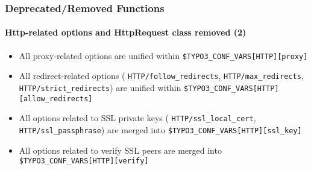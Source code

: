 \begin{frame}[fragile]
	\frametitle{Deprecated/Removed Functions}
	\framesubtitle{Http-related options and HttpRequest class removed (2)}

	\begin{itemize}

		\item All proxy-related options are unified within\newline
			\small\texttt{\$TYPO3\_CONF\_VARS[HTTP][proxy]}\normalsize

		\item All redirect-related options
			(\small
				\texttt{HTTP/follow\_redirects},
				\texttt{HTTP/max\_redirects},
				\texttt{HTTP/strict\_redirects}\normalsize)
			are unified within
			\small
				\texttt{\$TYPO3\_CONF\_VARS[HTTP][allow\_redirects]}
			\normalsize

		\item All options related to SSL private keys
			(\small
				\texttt{HTTP/ssl\_local\_cert},
				\texttt{HTTP/ssl\_passphrase}\normalsize)
			are merged into
			\small
				\texttt{\$TYPO3\_CONF\_VARS[HTTP][ssl\_key]}
			\normalsize

		\item All options related to verify SSL peers are merged into
			\small
				\texttt{\$TYPO3\_CONF\_VARS[HTTP][verify]}
			\normalsize

	\end{itemize}

\end{frame}


